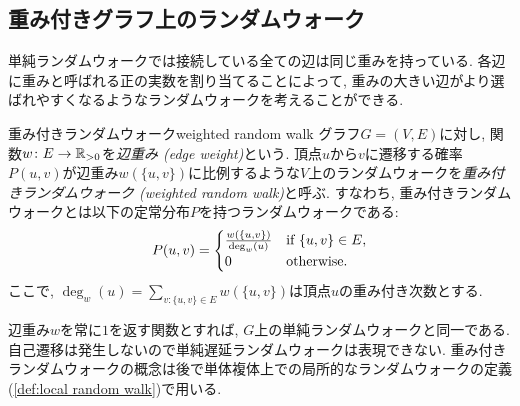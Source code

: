 \subsection{重み付きグラフ上のランダムウォーク}
単純ランダムウォークでは接続している全ての辺は同じ重みを持っている.
各辺に重みと呼ばれる正の実数を割り当てることによって,
重みの大きい辺がより選ばれやすくなるようなランダムウォークを考えることができる.
%
\begin{definition}{重み付きランダムウォーク}{weighted random walk}
  グラフ$G=(V,E)$に対し, 関数$w\colon E\to \mathbb{R}_{> 0}$を\emph{辺重み (edge weight)}という.
  頂点$u$から$v$に遷移する確率$P(u,v)$が辺重み$w(\{u,v\})$に比例するような$V$上のランダムウォークを\emph{重み付きランダムウォーク (weighted random walk)}と呼ぶ.
  すなわち, 重み付きランダムウォークとは以下の定常分布$P$を持つランダムウォークである:
  \[
    P(u,v) = \begin{cases}
        \frac{w(\{u,v\})}{\deg_w(u)} & \text{if } \{u,v\}\in E,\\
        0 & \text{otherwise}.
      \end{cases}
  \]
  ここで, $\deg_w(u)=\sum_{v\colon \{u,v\}\in E} w(\{u,v\})$は頂点$u$の重み付き次数とする.
\end{definition}
辺重み$w$を常に$1$を返す関数とすれば, $G$上の単純ランダムウォークと同一である.
自己遷移は発生しないので単純遅延ランダムウォークは表現できない.
重み付きランダムウォークの概念は後で単体複体上での局所的なランダムウォークの定義(\cref{def:local random walk})で用いる.

\begin{comment}
\section{混交時間解析の実例}
講義とは直接な関係はないが,
最後にランダムウォークの混交性解析の応用例をいくつか簡単に説明する.
より深く知りたい読者はLevinとPeresによるこの分野の標準的な教科書\cite{LP17}を参照されたい.

\subsection{到達時間, 全訪問時間の解析}
\subsection{マルコフ連鎖モンテカルロ法}
\subsection{イジングモデル}
\end{comment}

